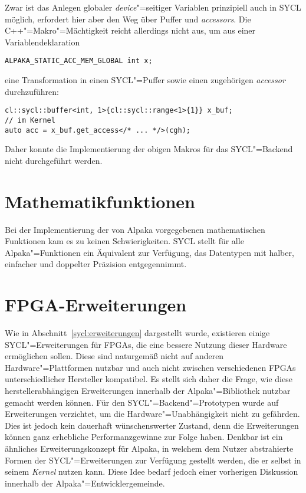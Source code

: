 Zwar ist das Anlegen globaler \textit{device}"=seitiger Variablen prinzipiell
auch in SYCL möglich, erfordert hier aber den Weg über Puffer und
\textit{accessors}. Die C++"=Makro"=Mächtigkeit reicht allerdings nicht aus, um
aus einer Variablendeklaration

\begin{code}
    \begin{verbatim}
ALPAKA_STATIC_ACC_MEM_GLOBAL int x;
    \end{verbatim}
\end{code}

eine Transformation in einen SYCL"=Puffer sowie einen zugehörigen
\textit{accessor} durchzuführen:

\begin{code}
    \begin{verbatim}
cl::sycl::buffer<int, 1>{cl::sycl::range<1>{1}} x_buf;
// im Kernel
auto acc = x_buf.get_access</* ... */>(cgh);
    \end{verbatim}
\end{code}

Daher konnte die Implementierung der obigen Makros für das SYCL"=Backend nicht
durchgeführt werden.

\section{Mathematikfunktionen}

Bei der Implementierung der von Alpaka vorgegebenen mathematischen Funktionen
kam es zu keinen Schwierigkeiten. SYCL stellt für alle Alpaka"=Funktionen ein
Äquivalent zur Verfügung, das Datentypen mit halber, einfacher und doppelter
Präzision entgegennimmt.

\section{FPGA-Erweiterungen}\label{implementierung:probleme:fpga}

Wie in Abschnitt~\ref{sycl:erweiterungen} dargestellt wurde, existieren einige
SYCL"=Erweiterungen für FPGAs, die eine bessere Nutzung dieser Hardware
ermöglichen sollen. Diese sind naturgemäß nicht auf anderen
Hardware"=Plattformen nutzbar und auch nicht zwischen verschiedenen
FPGAs unterschiedlicher Hersteller kompatibel. Es stellt sich daher die Frage,
wie diese herstellerabhängigen Erweiterungen innerhalb der Alpaka"=Bibliothek
nutzbar gemacht werden können. Für den SYCL"=Backend"=Prototypen wurde auf
Erweiterungen verzichtet, um die Hardware"=Unabhängigkeit nicht zu gefährden.
Dies ist jedoch kein dauerhaft wünschenswerter Zustand, denn die Erweiterungen
können ganz erhebliche Performanzgewinne zur Folge haben. Denkbar ist ein
ähnliches Erweiterungskonzept für Alpaka, in welchem dem Nutzer abstrahierte
Formen der SYCL"=Erweiterungen zur Verfügung gestellt werden, die er selbst in
seinem \textit{Kernel} nutzen kann. Diese Idee bedarf jedoch einer vorherigen Diskussion
innerhalb der Alpaka"=Entwicklergemeinde.

